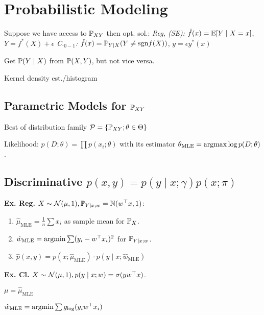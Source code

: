 \section{Probabilistic Modeling}
Suppose we have access to \(\P_{XY}\) then opt. sol.:
\textit{Reg, (SE):} \(\hat{f}(x) = \E[Y \mid X=x]\), \(Y = f^*(X) + \epsilon\)
\textit{C.\(_{0-1}\):} \(\hat{f}(x) = \P_{Y \mid X}(Y \neq \text{sgn} f(X))\), \(y = \epsilon y^*(x)\)

Get \(\P(Y \mid X)\) from \(\P(X, Y)\), but not vice versa.

\begin{definition}
  Kernel density est./histogram
\end{definition}

\subsection*{Parametric Models for \(\P_{XY}\)}
Best of distribution family \(\mathcal{P} = \{\P_{XY}; \theta \in \Theta\}\)

\begin{definition}[MLE]
  Likelihood: \(p(D; \theta) = \prod p(x_i; \theta)\) with its estimator \(\theta_{\text{MLE}} = \argmax \log p(D; \theta)\).
\end{definition}

\subsection[Discriminative]{Discriminative \(p(x, y) = p(y \mid x ; \gamma) p(x; \pi)\)}

\textbf{Ex. Reg.} \(X \sim \normal(\mu, 1), \P_{Y \mid x;w} = \N(w^\top x, 1)\):
\begin{enumerate}
  \item \(\hat{\mu}_{\text{MLE}} = \frac{1}{n}\sum x_i\) as sample mean for \(\P_X\).
  \item \(\hat{w}_{\text{MLE}} = \argmin \sum(y_i - w^\top x_i)^2\) for \(\P_{Y \mid x; w}\).
  \item \(\hat{p}(x, y) = p(x; \hat{\mu}_{\text{MLE}}) \cdot p(y \mid x; \hat{w}_{\text{MLE}})\)
\end{enumerate}

\textbf{Ex. Cl.} \(X \sim \normal(\mu, 1), p(y \mid x; w) = \sigma(y w^\top x)\).
\begin{enumerate*}
  \item \(\mu = \hat{\mu}_{\text{MLE}}\)
  \item \(\hat{w}_{\text{MLE}} = \argmin \sum g_{\text{log}}(y_iw^\top x_i)\)
\end{enumerate*}

